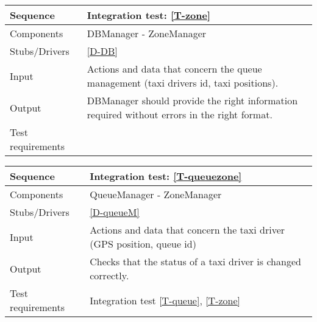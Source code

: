 \begin{table}[H]
    \begin{tabularx}{\textwidth}{l|X}
        \hline
        Sequence
        & 
        Integration test: \ref{T-zone}
        \\ \hline
        Components 
        & 
        DBManager - ZoneManager
        \\ \hline
        Stubs/Drivers 
        & 
        \ref{D-DB}
        \\ \hline
        Input 
        & 
        Actions and data that concern the queue management (taxi drivers id, taxi positions).
        \\ \hline
        Output 
        & 
        DBManager should provide the right information required without errors in the right format.
        \\ \hline
        Test requirements 
        & 
        
        \\ \hline
    \end{tabularx}
\end{table}

\begin{table}[H]
    \begin{tabularx}{\textwidth}{l|X}
        \hline
        Sequence
        & 
        Integration test: \ref{T-queuezone}
        \\ \hline
        Components 
        & 
        QueueManager - ZoneManager
        \\ \hline
        Stubs/Drivers 
        & 
        \ref{D-queueM}
        \\ \hline
        Input 
        & 
        Actions and data that concern the taxi driver (GPS position, queue id)
        \\ \hline
        Output 
        & 
        Checks that the status of a taxi driver is changed correctly.
        \\ \hline
        Test requirements 
        & 
        Integration test \ref{T-queue}, \ref{T-zone}
        \\ \hline
    \end{tabularx}
\end{table}

